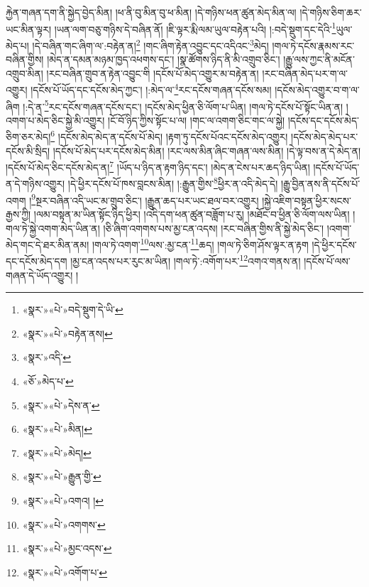 རྐྱེན་གཞན་དག་ནི་སྐྱེད་བྱེད་མིན། །ཕ་ནི་བུ་མིན་བུ་ཕ་མིན། །དེ་གཉིས་ཕན་ཚུན་མེད་མིན་ལ། །དེ་གཉིས་ཅིག་ཆར་ཡང་མིན་ལྟར། །ཡན་ལག་བཅུ་གཉིས་དེ་བཞིན་ནོ། །ཇི་ལྟར་རྨི་ལམ་ཡུལ་བརྟེན་པའི། །:བདེ་སྡུག་དང་དེའི་\footnote{«སྣར་»«པེ་»བདེ་སྡུག་དེ་ཡི་}ཡུལ་མེད་པ། །དེ་བཞིན་གང་ཞིག་ལ་:བརྟེན་ན།\footnote{«སྣར་»«པེ་»བརྟེན་ནས།} །གང་ཞིག་རྟེན་འབྱུང་དང་འདིའང་\footnote{«སྣར་»འདི་}མེད། །གལ་ཏེ་དངོས་རྣམས་རང་བཞིན་གྱིས། །མེད་ན་དམན་མཉམ་ཁྱད་འཕགས་དང་། །སྣ་ཚོགས་ཉིད་ནི་མི་འགྲུབ་ཅིང་། །རྒྱུ་ལས་ཀྱང་ནི་མངོན་འགྲུབ་མིན། །རང་བཞིན་གྲུབ་ན་རྟེན་འབྱུང་གི །དངོས་པོ་མེད་འགྱུར་མ་བརྟེན་ན། །རང་བཞིན་མེད་པར་ག་ལ་འགྱུར། །དངོས་པོ་ཡོད་དང་དངོས་མེད་ཀྱང་། །:མེད་ལ་\footnote{«ཅོ་»མེད་པ་}རང་དངོས་གཞན་དངོས་སམ། །དངོས་མེད་འགྱུར་བ་ག་ལ་ཞིག །:དེ་ན་\footnote{«སྣར་»«པེ་»དེས་ན་}རང་དངོས་གཞན་དངོས་དང་། །དངོས་མེད་ཕྱིན་ཅི་ལོག་པ་ཡིན། །གལ་ཏེ་དངོས་པོ་སྟོང་ཡིན་ན། །འགག་པ་མེད་ཅིང་སྐྱེ་མི་འགྱུར། །ངོ་བོ་ཉིད་ཀྱིས་སྟོང་པ་ལ། །གང་ལ་འགག་ཅིང་གང་ལ་སྐྱེ། །དངོས་དང་དངོས་མེད་ཅིག་ཅར་མེད།\footnote{«སྣར་»«པེ་»མིན།} །དངོས་མེད་མེད་ན་དངོས་པོ་མེད། །རྟག་ཏུ་དངོས་པོའང་དངོས་མེད་འགྱུར། །དངོས་མེད་མེད་པར་དངོས་མི་སྲིད། །དངོས་པོ་མེད་པར་དངོས་མེད་མིན། །རང་ལས་མིན་ཞིང་གཞན་ལས་མིན། །དེ་ལྟ་བས་ན་དེ་མེད་ན། །དངོས་པོ་མེད་ཅིང་དངོས་མེད་ན།\footnote{«སྣར་»«པེ་»མེད།} །ཡོད་པ་ཉིད་ན་རྟག་ཉིད་དང་། །མེད་ན་ངེས་པར་ཆད་ཉིད་ཡིན། །དངོས་པོ་ཡོད་ན་དེ་གཉིས་འགྱུར། །དེ་ཕྱིར་དངོས་པོ་ཁས་བླངས་མིན། །:རྒྱུན་གྱིས་\footnote{«སྣར་»«པེ་»རྒྱུན་གྱི་}ཕྱིར་ན་འདི་མེད་དེ། །རྒྱུ་བྱིན་ནས་ནི་དངོས་པོ་འགག །\footnote{«སྣར་»«པེ་»འགའ། །}སྔར་བཞིན་འདི་ཡང་མ་གྲུབ་ཅིང་། །རྒྱུན་ཆད་པར་ཡང་ཐལ་བར་འགྱུར། །སྐྱེ་འཇིག་བསྟན་ཕྱིར་སངས་རྒྱས་ཀྱི། །ལམ་བསྟན་མ་ཡིན་སྟོང་ཉིད་ཕྱིར། །འདི་དག་ཕན་ཚུན་བཟློག་པ་རུ། །མཐོང་བ་ཕྱིན་ཅི་ལོག་ལས་ཡིན། །གལ་ཏེ་སྐྱེ་འགག་མེད་ཡིན་ན། །ཅི་ཞིག་འགགས་པས་མྱ་ངན་འདས། །རང་བཞིན་གྱིས་ནི་སྐྱེ་མེད་ཅིང་། །འགག་མེད་གང་དེ་ཐར་མིན་ནམ། །གལ་ཏེ་འགག་\footnote{«སྣར་»«པེ་»འགགས་}ལས་:མྱ་ངན་\footnote{«སྣར་»«པེ་»མྱང་འདས་}ཆད། །གལ་ཏེ་ཅིག་ཤོས་ལྟར་ན་རྟག །དེ་ཕྱིར་དངོས་དང་དངོས་མེད་དག །མྱ་ངན་འདས་པར་རུང་མ་ཡིན། །གལ་ཏེ་:འགོག་པར་\footnote{«སྣར་»«པེ་»འགོག་པ་}འགའ་གནས་ན། །དངོས་པོ་ལས་གཞན་དེ་ཡོད་འགྱུར། །
